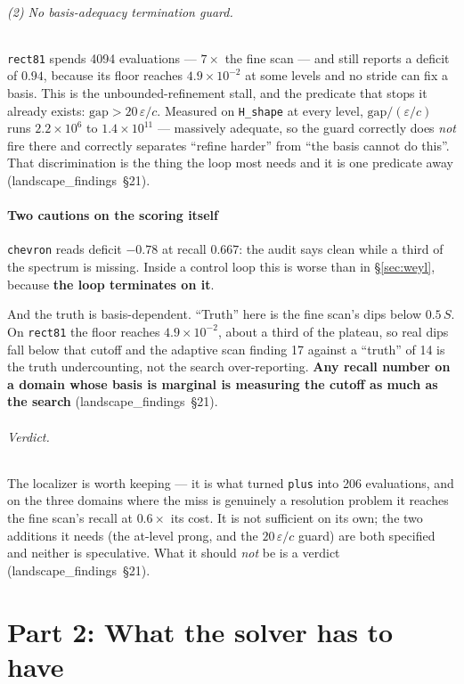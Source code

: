 \documentclass[11pt]{article}
\newcommand{\file}[1]{\texttt{#1}}
\newcommand{\lf}[1]{(landscape\_findings~\S#1)}
\begin{document}
\paragraph{(2) No basis-adequacy termination guard.}
\file{rect81} spends 4094 evaluations --- $7\times$ the fine scan --- and still reports a
deficit of $0.94$, because its floor reaches $4.9\times10^{-2}$ at some levels and no stride can
fix a basis. This is the unbounded-refinement stall, and the predicate that stops it already
exists: $\text{gap} > 20\,\varepsilon/c$. Measured on \file{H\_shape} at every level,
$\text{gap}/(\varepsilon/c)$ runs $2.2\times10^{6}$ to $1.4\times10^{11}$ --- massively adequate,
so the guard correctly does \emph{not} fire there and correctly separates ``refine harder'' from
``the basis cannot do this''. That discrimination is the thing the loop most needs and it is one
predicate away \lf{21}.

\subsection{Two cautions on the scoring itself}

\file{chevron} reads deficit $-0.78$ at recall $0.667$: the audit says clean while a third of the
spectrum is missing. Inside a control loop this is worse than in \S\ref{sec:weyl}, because
\textbf{the loop terminates on it}.

And the truth is basis-dependent. ``Truth'' here is the fine scan's dips below $0.5\,S$. On
\file{rect81} the floor reaches $4.9\times10^{-2}$, about a third of the plateau, so real dips
fall below that cutoff and the adaptive scan finding 17 against a ``truth'' of 14 is the truth
undercounting, not the search over-reporting. \textbf{Any recall number on a domain whose basis
is marginal is measuring the cutoff as much as the search} \lf{21}.

\paragraph{Verdict.} The localizer is worth keeping --- it is what turned \file{plus} into 206
evaluations, and on the three domains where the miss is genuinely a resolution problem it reaches
the fine scan's recall at $0.6\times$ its cost. It is not sufficient on its own; the two additions
it needs (the at-level prong, and the $20\,\varepsilon/c$ guard) are both specified and neither
is speculative. What it should \emph{not} be is a verdict \lf{21}.

\part*{Part 2: What the solver has to have}
\end{document}
